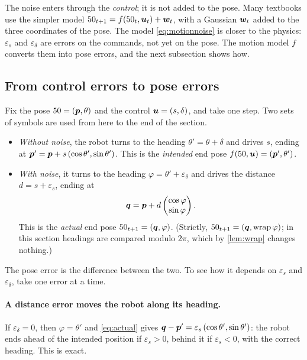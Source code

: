 The noise enters through the \emph{control}; it is not added to the pose.
Many textbooks use the simpler model $50_{t+1}=f(50_t,\bm{u}_t)+\bm{w}_t$,
with a Gaussian $\bm{w}_t$ added to the three coordinates of the pose.
The model \eqref{eq:motionnoise} is closer to the physics: $\varepsilon_s$
and $\varepsilon_\delta$ are errors on the commands, not yet on the pose.
The motion model $f$ converts them into pose errors, and the next
subsection shows how.

\subsection{From control errors to pose errors}
\label{sec:errors}

Fix the pose $50=(\bm{p},\theta)$ and the control $\bm{u}=(s,\delta)$, and take one
step. Two sets of symbols are used from here to the end of the section.
\begin{itemize}[nosep]
  \item \emph{Without noise}, the robot turns to the heading
    $\theta'=\theta+\delta$ and drives $s$, ending at
    $\bm{p}'=\bm{p}+s\,(\cos\theta',\sin\theta')$. This is the \emph{intended} end
    pose $f(50,\bm{u})=(\bm{p}',\theta')$.
  \item \emph{With noise}, it turns to the heading
    $\varphi=\theta'+\varepsilon_\delta$ and drives the distance
    $d=s+\varepsilon_s$, ending at
    \begin{equation}\label{eq:actual}
      \bm{q}=\bm{p}+d\begin{pmatrix}\cos\varphi\\ \sin\varphi\end{pmatrix}.
    \end{equation}
    This is the \emph{actual} end pose $50_{t+1}=(\bm{q},\varphi)$. (Strictly,
    $50_{t+1}=(\bm{q},\operatorname{wrap}\varphi)$; in this section headings are compared
    modulo $2\pi$, which by \cref{lem:wrap} changes nothing.)
\end{itemize}
The pose error is the difference between the two. To see how it depends on
$\varepsilon_s$ and $\varepsilon_\delta$, take one error at a time.

\paragraph{A distance error moves the robot along its heading.} If
$\varepsilon_\delta=0$, then $\varphi=\theta'$ and \eqref{eq:actual} gives
$\bm{q}-\bm{p}'=\varepsilon_s\,(\cos\theta',\sin\theta')$: the robot ends ahead of
the intended position if $\varepsilon_s>0$, behind it if
$\varepsilon_s<0$, with the correct heading. This is exact.

